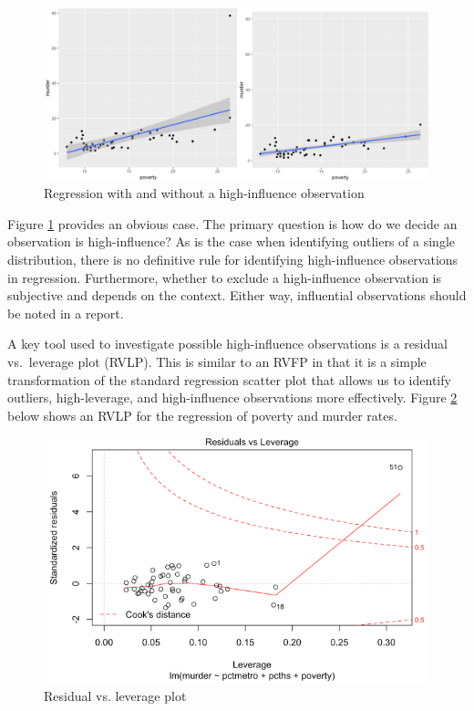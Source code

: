 \documentclass[
]{book}
\begin{document}
\begin{figure}
\includegraphics[width=14.94in]{images/influential} \caption{Regression with and without a high-influence observation}\label{fig:influential}
\end{figure}

Figure \ref{fig:influential} provides an obvious case. The primary question is how do we decide an observation is high-influence? As is the case when identifying outliers of a single distribution, there is no definitive rule for identifying high-influence observations in regression. Furthermore, whether to exclude a high-influence observation is subjective and depends on the context. Either way, influential observations should be noted in a report.

A key tool used to investigate possible high-influence observations is a residual vs.~leverage plot (RVLP). This is similar to an RVFP in that it is a simple transformation of the standard regression scatter plot that allows us to identify outliers, high-leverage, and high-influence observations more effectively. Figure \ref{fig:rvlp} below shows an RVLP for the regression of poverty and murder rates.

\begin{figure}
\includegraphics[width=9.28in]{images/rvlp} \caption{Residual vs. leverage plot}\label{fig:rvlp}
\end{figure}
\end{document}
